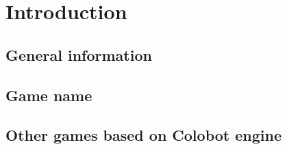 
\chapter{Introduction}

\section*{General information}

\section*{Game name}

\section*{Other games based on Colobot engine}
